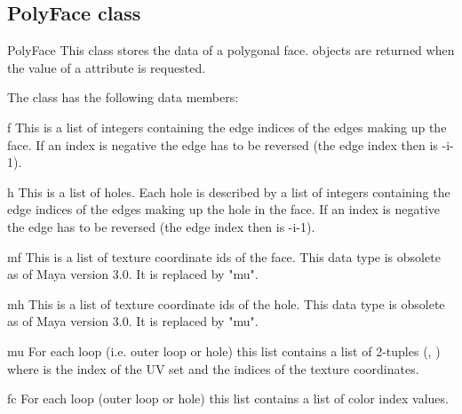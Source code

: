 \subsection{PolyFace class}
\label{polyface}

\begin{classdesc*}{PolyFace}
This class stores the data of a polygonal face.  objects
are returned when the value of a  attribute is requested.
\end{classdesc*}

The class has the following data members:

\begin{memberdesc}{f}
This is a list of integers containing the edge indices of the edges 
making up the face. If an index is negative the edge has to be
reversed (the edge index then is -i-1).
\end{memberdesc}

\begin{memberdesc}{h}
This is a list of holes. Each hole is described by a list of integers 
containing the edge indices of the edges 
making up the hole in the face. If an index is negative the edge has to be
reversed (the edge index then is -i-1).
\end{memberdesc}

\begin{memberdesc}{mf}
This is a list of texture coordinate ids of the face. This data type
is obsolete as of Maya version 3.0. It is replaced by "mu".
\end{memberdesc}

\begin{memberdesc}{mh}
This is a list of texture coordinate ids of the hole. This data type
is obsolete as of Maya version 3.0. It is replaced by "mu".
\end{memberdesc}

\begin{memberdesc}{mu}
For each loop (i.e. outer loop or hole) this list contains a list of
2-tuples (, ) where  is the index of
the UV set and  the indices of the texture coordinates.
\end{memberdesc}

\begin{memberdesc}{fc}
For each loop (outer loop or hole) this list contains a list of color 
index values.
\end{memberdesc}

